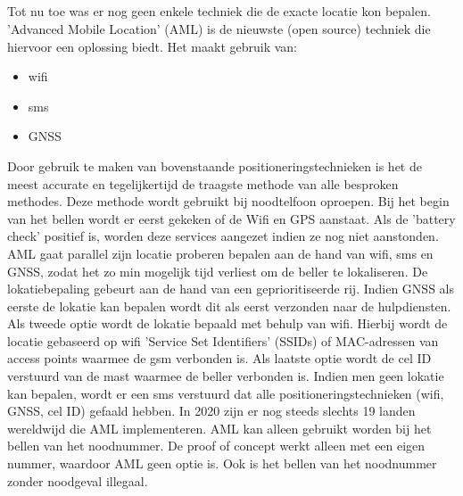 \subsection{}
Tot nu toe was er nog geen enkele techniek die de exacte locatie kon bepalen. 'Advanced Mobile Location' (AML) is de nieuwste (open source) techniek die hiervoor een oplossing biedt. Het maakt gebruik van:
\begin{itemize}
	\item wifi
	\item sms
	\item GNSS
\end{itemize}
Door gebruik te maken van bovenstaande positioneringstechnieken is het de meest accurate en tegelijkertijd de traagste methode van alle besproken methodes. 
\newline
Deze methode wordt gebruikt bij noodtelfoon oproepen. Bij het begin van het bellen wordt er eerst gekeken of de Wifi en GPS aanstaat. Als de 'battery check' positief is, worden deze services aangezet indien ze nog niet aanstonden. 
\newline
AML gaat parallel zijn locatie proberen bepalen aan de hand van wifi, sms en GNSS, zodat het zo min mogelijk tijd verliest om de beller te lokaliseren. De lokatiebepaling gebeurt aan de hand van een geprioritiseerde rij. Indien GNSS als eerste de lokatie kan bepalen wordt dit als eerst verzonden naar de hulpdiensten. 
Als tweede optie wordt de lokatie bepaald met behulp van wifi. Hierbij wordt de locatie gebaseerd op wifi 'Service Set Identifiers' (SSIDs) of MAC-adressen van access points waarmee de gsm verbonden is. Als laatste optie wordt de cel ID verstuurd van de mast waarmee de beller verbonden is. Indien men geen lokatie kan bepalen, wordt er een sms verstuurd dat alle positioneringstechnieken (wifi, GNSS, cel ID) gefaald hebben.
\newline
In 2020 zijn er nog steeds slechts 19 landen wereldwijd die AML implementeren. AML kan alleen gebruikt worden bij het bellen van het noodnummer. De proof of concept werkt alleen met een eigen nummer, waardoor AML geen optie is. \autocite{aml} Ook is het bellen van het noodnummer zonder noodgeval illegaal.
